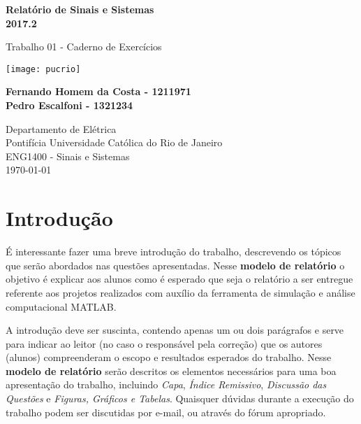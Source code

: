 \documentclass[12pt,a4paper]{report}
\begin{document}
\begin{titlepage}
	\begin{center}
		\vspace*{1cm}

		\Huge
		\textbf{Relatório de Sinais e Sistemas}\\
		\Large
		\textbf{2017.2}

		\vspace{0.5cm}
		\Large
		Trabalho 01 - Caderno de Exercícios

		\vspace{1.5cm}

		\texttt{[image: pucrio]}

		\vspace{1.5cm}

		\normalsize
		\textbf{Fernando Homem da Costa - 1211971}\\
		\textbf{Pedro Escalfoni - 1321234}

		\vfill

		\Large
		Departamento de Elétrica\\
		Pontifícia Universidade Católica do Rio de Janeiro\\
		ENG1400 - Sinais e Sistemas\\
		\today

	\end{center}
\end{titlepage}

\tableofcontents
\newpage

\section*{Introdução}

É interessante fazer uma breve introdução do trabalho, descrevendo os tópicos que serão abordados nas questões apresentadas. Nesse \textbf{modelo de relatório} o objetivo é explicar aos alunos como é esperado que seja o relatório a ser entregue referente aos projetos realizados com auxílio da ferramenta de simulação e análise computacional MATLAB\textsuperscript{\textregistered}.

A introdução deve ser suscinta, contendo apenas um ou dois parágrafos e serve para indicar ao leitor (no caso o responsável pela correção) que os autores (alunos) compreenderam o escopo e resultados esperados do trabalho. Nesse \textbf{modelo de relatório} serão descritos os elementos necessários para uma boa apresentação do trabalho, incluindo \textit{Capa}, \textit{Índice Remissivo}, \textit{Discussão das Questões} e \textit{Figuras, Gráficos e Tabelas}. Quaisquer dúvidas durante a execução do trabalho podem ser discutidas por e-mail, ou através do fórum apropriado. 
\end{document}
